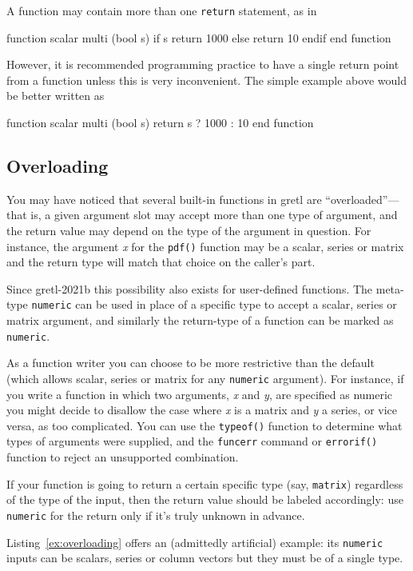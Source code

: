 A function may contain more than one \texttt{return} statement, as in
%
\begin{code}
function scalar multi (bool s)
   if s
      return 1000
   else
      return 10
   endif
end function
\end{code}
%
However, it is recommended programming practice to have a single
return point from a function unless this is very inconvenient.  The
simple example above would be better written as
%
\begin{code}
function scalar multi (bool s)
   return s ? 1000 : 10
end function
\end{code}
    
\subsection{Overloading}

You may have noticed that several built-in functions in gretl are
``overloaded''---that is, a given argument slot may accept more than
one type of argument, and the return value may depend on the type of
the argument in question. For instance, the argument \textsl{x} for
the \texttt{pdf()} function may be a scalar, series or matrix and the
return type will match that choice on the caller's part.

Since gretl-2021b this possibility also exists for user-defined
functions. The meta-type \texttt{numeric} can be used in place of a
specific type to accept a scalar, series or matrix argument, and
similarly the return-type of a function can be marked as
\texttt{numeric}.

As a function writer you can choose to be more restrictive than the
default (which allows scalar, series or matrix for any
\texttt{numeric} argument). For instance, if you write a function in
which two arguments, \textsl{x} and \textsl{y}, are specified as
numeric you might decide to disallow the case where \textsl{x} is a
matrix and \textsl{y} a series, or vice versa, as too complicated. You
can use the \texttt{typeof()} function to determine what types of
arguments were supplied, and the \texttt{funcerr} command or
\texttt{errorif()} function to reject an unsupported combination.

If your function is going to return a certain specific type (say,
\texttt{matrix}) regardless of the type of the input, then the return
value should be labeled accordingly: use \texttt{numeric} for the
return only if it's truly unknown in advance.

Listing~\ref{ex:overloading} offers an (admittedly artificial) example:
its \texttt{numeric} inputs can be scalars, series or column vectors
but they must be of a single type.

